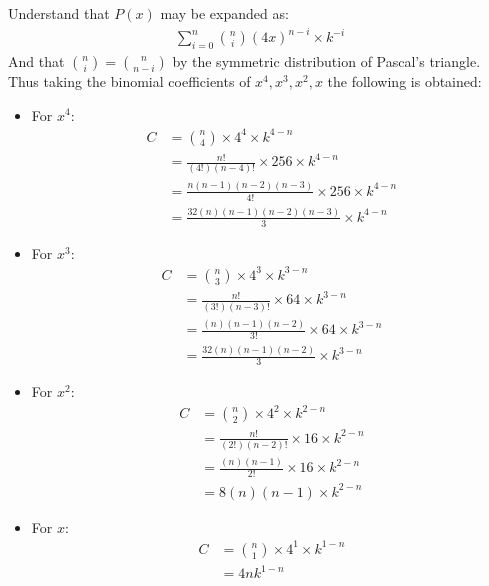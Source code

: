\documentclass[12pt]{article}
\begin{document}
Understand that $P(x)$ may be expanded as:
\begin{align*}
	\displaystyle\sum_{i=0}^{n}{\binom{n}{i} (4x)^{n-i} \times k^{-i}}
\end{align*}
And that $\binom{n}{i} = \binom{n}{n-i}$ by the symmetric distribution of Pascal's triangle. \\
Thus taking the binomial coefficients of $x^4, x^3, x^2, x$ the following is obtained:
\begin{itemize}
	\item For $x^4$:
	      \begin{equation}
		      \begin{split}
			      C & = \binom{n}{4} \times 4^4 \times k^{4-n}                \\
			        & = \frac{n!}{(4!)(n-4)!} \times 256 \times k^{4-n}       \\
			        & = \frac{n(n-1)(n-2)(n-3)}{4!} \times 256 \times k^{4-n} \\
			        & = \frac{32(n)(n-1)(n-2)(n-3)}{3} \times k^{4-n}
		      \end{split}
		      \label{eq:No.1}
	      \end{equation}

	\item For $x^3$:
	      \begin{equation}
		      \begin{split}
			      C & = \binom{n}{3} \times 4^3 \times k^{3-n}            \\
			        & = \frac{n!}{(3!)(n-3)!} \times 64 \times k^{3-n}    \\
			        & = \frac{(n)(n-1)(n-2)}{3!} \times 64 \times k^{3-n} \\
			        & = \frac{32(n)(n-1)(n-2)}{3} \times k^{3-n}
		      \end{split}
		      \label{eq:No.2}
	      \end{equation}

	\item For $x^2$:
	      \begin{equation}
		      \begin{split}
			      C & = \binom{n}{2} \times 4^2 \times k^{2-n}         \\
			        & = \frac{n!}{(2!)(n-2)!} \times 16 \times k^{2-n} \\
			        & = \frac{(n)(n-1)}{2!} \times 16 \times k^{2-n}   \\
			        & = 8(n)(n-1) \times k^{2-n}
		      \end{split}
		      \label{eq:No.3}
	      \end{equation}

	\item For $x$:
	      \begin{equation}
		      \begin{split}
			      C & = \binom{n}{1} \times 4^1 \times k^{1-n} \\
			        & =  4nk^{1-n}
		      \end{split}
		      \label{eq:No.4}
	      \end{equation}
\end{itemize}
\end{document}
